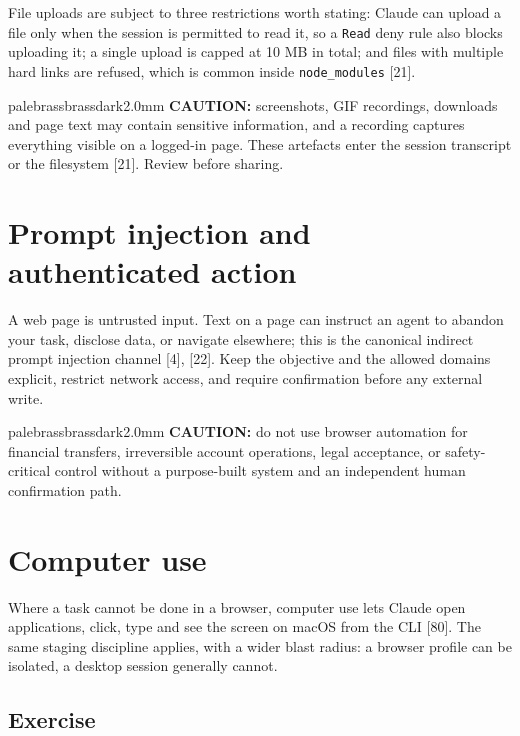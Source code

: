 \documentclass[11pt,a4paper,twoside,openany]{book}
\begin{document}
File uploads are subject to three restrictions worth stating: Claude can upload a file only when the session is permitted to read it, so a \texttt{Read} deny rule also blocks uploading it; a single upload is capped at 10 MB in total; and files with multiple hard links are refused, which is common inside \texttt{node\_\allowbreak{}modules} [21].


\begin{calloutbox}{palebrass}{brassdark}{2.0mm}
\textbf{CAUTION:} screenshots, GIF recordings, downloads and page text may contain sensitive information, and a recording captures everything visible on a logged-in page. These artefacts enter the session transcript or the filesystem [21]. Review before sharing.
\end{calloutbox}

\FloatBarrier
\setcounter{section}{4}
\section{Prompt injection and authenticated action}

A web page is untrusted input. Text on a page can instruct an agent to abandon your task, disclose data, or navigate elsewhere; this is the canonical indirect prompt injection channel [4], [22]. Keep the objective and the allowed domains explicit, restrict network access, and require confirmation before any external write.


\begin{calloutbox}{palebrass}{brassdark}{2.0mm}
\textbf{CAUTION:} do not use browser automation for financial transfers, irreversible account operations, legal acceptance, or safety-critical control without a purpose-built system and an independent human confirmation path.
\end{calloutbox}

\FloatBarrier
\setcounter{section}{5}
\section{Computer use}

Where a task cannot be done in a browser, computer use lets Claude open applications, click, type and see the screen on macOS from the CLI [80]. The same staging discipline applies, with a wider blast radius: a browser profile can be isolated, a desktop session generally cannot.


\subsection*{Exercise}
\end{document}
